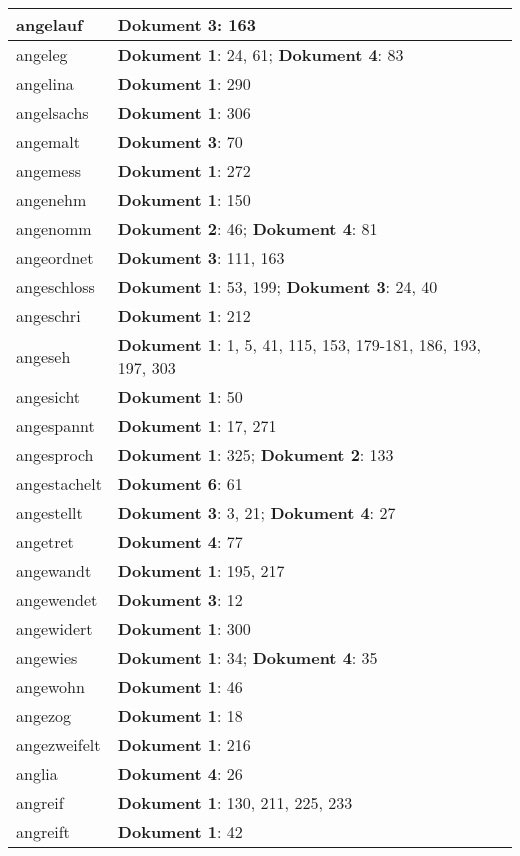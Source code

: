 \documentclass[a5paper]{article}
\begin{document}
\begin{longtable}[l]{|l|p{3in}|}
\hline
angelauf & \textbf{Dokument 3}: 163 \\
\hline
angeleg & \textbf{Dokument 1}: 24, 61; \textbf{Dokument 4}: 83 \\
\hline
angelina & \textbf{Dokument 1}: 290 \\
\hline
angelsachs & \textbf{Dokument 1}: 306 \\
\hline
angemalt & \textbf{Dokument 3}: 70 \\
\hline
angemess & \textbf{Dokument 1}: 272 \\
\hline
angenehm & \textbf{Dokument 1}: 150 \\
\hline
angenomm & \textbf{Dokument 2}: 46; \textbf{Dokument 4}: 81 \\
\hline
angeordnet & \textbf{Dokument 3}: 111, 163 \\
\hline
angeschloss & \textbf{Dokument 1}: 53, 199; \textbf{Dokument 3}: 24, 40 \\
\hline
angeschri & \textbf{Dokument 1}: 212 \\
\hline
angeseh & \textbf{Dokument 1}: 1, 5, 41, 115, 153, 179-181, 186, 193, 197, 303 \\
\hline
angesicht & \textbf{Dokument 1}: 50 \\
\hline
angespannt & \textbf{Dokument 1}: 17, 271 \\
\hline
angesproch & \textbf{Dokument 1}: 325; \textbf{Dokument 2}: 133 \\
\hline
angestachelt & \textbf{Dokument 6}: 61 \\
\hline
angestellt & \textbf{Dokument 3}: 3, 21; \textbf{Dokument 4}: 27 \\
\hline
angetret & \textbf{Dokument 4}: 77 \\
\hline
angewandt & \textbf{Dokument 1}: 195, 217 \\
\hline
angewendet & \textbf{Dokument 3}: 12 \\
\hline
angewidert & \textbf{Dokument 1}: 300 \\
\hline
angewies & \textbf{Dokument 1}: 34; \textbf{Dokument 4}: 35 \\
\hline
angewohn & \textbf{Dokument 1}: 46 \\
\hline
angezog & \textbf{Dokument 1}: 18 \\
\hline
angezweifelt & \textbf{Dokument 1}: 216 \\
\hline
anglia & \textbf{Dokument 4}: 26 \\
\hline
angreif & \textbf{Dokument 1}: 130, 211, 225, 233 \\
\hline
angreift & \textbf{Dokument 1}: 42 \\

\end{longtable}
\end{document}
